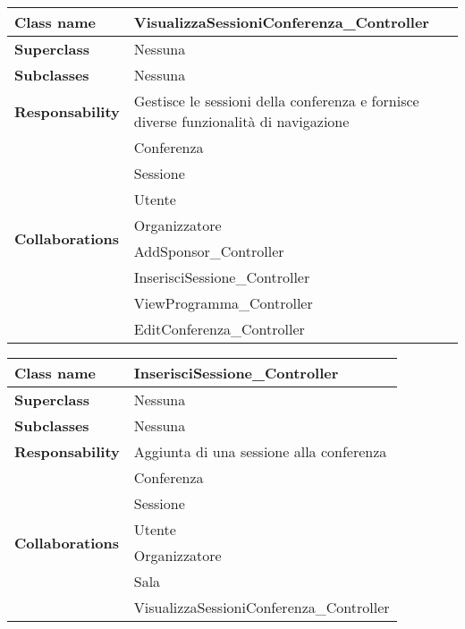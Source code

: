 \begin{table}[h!]
	\begin{tabular}{|l|l|}
		\hline 
		\textbf{Class name} & VisualizzaSessioniConferenza\_Controller
		\\ \hline
		\textbf{Superclass} & Nessuna
		\\ \hline
		\multirow{1}{*}{\textbf{Subclasses}} & Nessuna
		\\ \hline
		\textbf{Responsability} & Gestisce le sessioni della conferenza e fornisce diverse funzionalità di navigazione
		\\ \hline
		\multirow{8}{*}{\textbf{Collaborations}} & Conferenza \\
		& Sessione\\
		& Utente\\
		& Organizzatore\\
		& AddSponsor\_Controller\\
		& InserisciSessione\_Controller\\
		& ViewProgramma\_Controller\\
		& EditConferenza\_Controller
		\\ \hline
	\end{tabular}
\end{table}

\begin{table}[h!]
	\begin{tabular}{|l|l|}
		\hline 
		\textbf{Class name} & InserisciSessione\_Controller
		\\ \hline
		\textbf{Superclass} & Nessuna
		\\ \hline
		\multirow{1}{*}{\textbf{Subclasses}} & Nessuna
		\\ \hline
		\textbf{Responsability} & Aggiunta di una sessione alla conferenza
		\\ \hline
		\multirow{6}{*}{\textbf{Collaborations}} & Conferenza \\
		& Sessione\\
		& Utente\\
		& Organizzatore\\
		& Sala\\
		& VisualizzaSessioniConferenza\_Controller
		\\ \hline
	\end{tabular}
\end{table}

